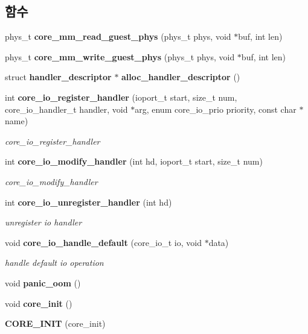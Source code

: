 \subsection*{함수}
\begin{DoxyCompactItemize}
\item 
phys\-\_\-t {\bfseries core\-\_\-mm\-\_\-read\-\_\-guest\-\_\-phys} (phys\-\_\-t phys, void $\ast$buf, int len)\label{core_8c_ab1993aecb38f15c17376b1bfe177c7d1}

\item 
phys\-\_\-t {\bfseries core\-\_\-mm\-\_\-write\-\_\-guest\-\_\-phys} (phys\-\_\-t phys, void $\ast$buf, int len)\label{core_8c_aefc9af00d27a366118da9e08055b6669}

\item 
struct {\bf handler\-\_\-descriptor} $\ast$ {\bfseries alloc\-\_\-handler\-\_\-descriptor} ()\label{core_8c_a9ce7943618e2f0478aad2467c8661011}

\item 
int {\bf core\-\_\-io\-\_\-register\-\_\-handler} (ioport\-\_\-t start, size\-\_\-t num, core\-\_\-io\-\_\-handler\-\_\-t handler, void $\ast$arg, enum core\-\_\-io\-\_\-prio priority, const char $\ast$name)
\begin{DoxyCompactList}\small\item\em core\-\_\-io\-\_\-register\-\_\-handler \end{DoxyCompactList}\item 
int {\bf core\-\_\-io\-\_\-modify\-\_\-handler} (int hd, ioport\-\_\-t start, size\-\_\-t num)
\begin{DoxyCompactList}\small\item\em core\-\_\-io\-\_\-modify\-\_\-handler \end{DoxyCompactList}\item 
int {\bf core\-\_\-io\-\_\-unregister\-\_\-handler} (int hd)
\begin{DoxyCompactList}\small\item\em unregister io handler \end{DoxyCompactList}\item 
void {\bf core\-\_\-io\-\_\-handle\-\_\-default} (core\-\_\-io\-\_\-t io, void $\ast$data)
\begin{DoxyCompactList}\small\item\em handle default io operation \end{DoxyCompactList}\item 
void {\bfseries panic\-\_\-oom} ()\label{core_8c_a0d1e14cc93c27697e1bd1db081cb6e06}

\item 
void {\bfseries core\-\_\-init} ()\label{core_8c_a166d6adeedf84c1aad6848b3573382e6}

\item 
{\bfseries C\-O\-R\-E\-\_\-\-I\-N\-I\-T} (core\-\_\-init)\label{core_8c_a1201a35737d21eddeaf96ddb867d55cd}

\end{DoxyCompactItemize}
